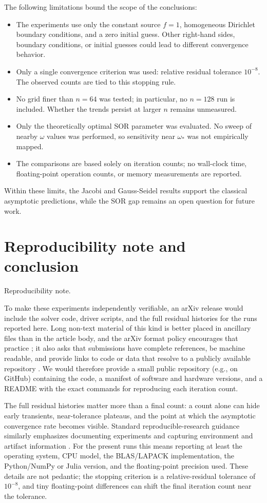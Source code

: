 \documentclass[11pt]{article}
\begin{document}
The following limitations bound the scope of the conclusions:

\begin{itemize}
  \item The experiments use only the constant source \(f=1\), homogeneous Dirichlet boundary conditions, and a zero initial guess. Other right-hand sides, boundary conditions, or initial guesses could lead to different convergence behavior.
  \item Only a single convergence criterion was used: relative residual tolerance \(10^{-8}\). The observed counts are tied to this stopping rule.
  \item No grid finer than \(n=64\) was tested; in particular, no \(n=128\) run is included. Whether the trends persist at larger \(n\) remains unmeasured.
  \item Only the theoretically optimal SOR parameter was evaluated. No sweep of nearby \(\omega\) values was performed, so sensitivity near \(\omega_*\) was not empirically mapped.
  \item The comparisons are based solely on iteration counts; no wall-clock time, floating-point operation counts, or memory measurements are reported.
\end{itemize}

Within these limits, the Jacobi and Gauss-Seidel results support the classical asymptotic predictions, while the SOR gap remains an open question for future work.
\section{Reproducibility note and conclusion}
Reproducibility note.

To make these experiments independently verifiable, an arXiv release would include the solver code, driver scripts, and the full residual histories for the runs reported here. Long non-text material of this kind is better placed in ancillary files than in the article body, and the arXiv format policy encourages that practice \cite{arxivpolicies}; it also asks that submissions have complete references, be machine readable, and provide links to code or data that resolve to a publicly available repository \cite{arxivpolicies}. We would therefore provide a small public repository (e.g., on GitHub) containing the code, a manifest of software and hardware versions, and a README with the exact commands for reproducing each iteration count.

The full residual histories matter more than a final count: a count alone can hide early transients, near-tolerance plateaus, and the point at which the asymptotic convergence rate becomes visible. Standard reproducible-research guidance similarly emphasizes documenting experiments and capturing environment and artifact information \cite{institutereproducible}. For the present runs this means reporting at least the operating system, CPU model, the BLAS/LAPACK implementation, the Python/NumPy or Julia version, and the floating-point precision used. These details are not pedantic; the stopping criterion is a relative-residual tolerance of \(10^{-8}\), and tiny floating-point differences can shift the final iteration count near the tolerance.
\end{document}
